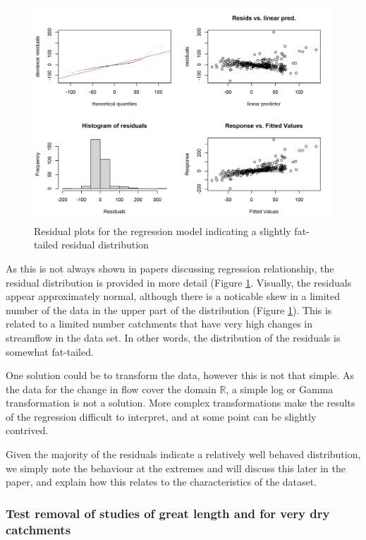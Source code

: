 \documentclass[]{elsarticle} %
\begin{document}
\begin{figure}
\includegraphics[width=0.9\linewidth]{residual_plot_model_all} \caption{Residual plots for the regression model indicating a slightly fat-tailed residual distribution}\label{fig:gamcheckmodelall}
\end{figure}

As this is not always shown in papers discussing regression relationship, the residual distribution is provided in more detail (Figure \ref{fig:gamcheckmodelall}. Visually, the residuals appear approximately normal, although there is a noticable skew in a limited number of the data in the upper part of the distribution (Figure \ref{fig:gamcheckmodelall}). This is related to a limited number catchments that have very high changes in streamflow in the data set. In other words, the distribution of the residuals is somewhat fat-tailed.

One solution could be to transform the data, however this is not that simple. As the data for the change in flow cover the domain \(\mathbb{R}\), a simple log or Gamma transformation is not a solution. More complex transformations make the results of the regression difficult to interpret, and at some point can be slightly contrived.

Given the majority of the residuals indicate a relatively well behaved distribution, we simply note the behaviour at the extremes and will discuss this later in the paper, and explain how this relates to the characteristics of the dataset.

\hypertarget{test-removal-of-studies-of-great-length-and-for-very-dry-catchments}{%
\subsubsection{Test removal of studies of great length and for very dry catchments}\label{test-removal-of-studies-of-great-length-and-for-very-dry-catchments}}
\end{document}
